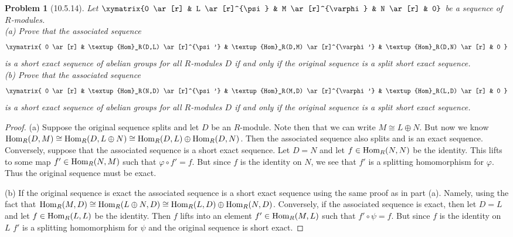 \documentclass{article}
\newcommand{\Hom}{\textup{Hom}}
\newtheorem{problem}{Problem}
\begin{document}
\begin{problem}[10.5.14]
Let $\xymatrix{0 \ar[r] & L \ar[r]^{\psi} & M \ar[r]^{\varphi} & N \ar[r] & 0}$ be a sequence of $R$-modules.\\
(a) Prove that the associated sequence
\[
\xymatrix{
0 \ar[r] & \Hom_R(D,L) \ar[r]^{\psi'} & \Hom_R(D,M) \ar[r]^{\varphi'} & \Hom_R(D,N) \ar[r] & 0
}
\]
is a short exact sequence of abelian groups for all $R$-modules $D$ if and only if the original sequence is a split short exact sequence.\\
(b) Prove that the associated sequence
\[
\xymatrix{
0 \ar[r] & \Hom_R(N,D) \ar[r]^{\psi'} & \Hom_R(M,D) \ar[r]^{\varphi'} & \Hom_R(L,D) \ar[r] & 0
}
\]
is a short exact sequence of abelian groups for all $R$-modules $D$ if and only if the original sequence is a split short exact sequence.
\end{problem}
\begin{proof}
(a) Suppose the original sequence splits and let $D$ be an $R$-module. Note then that we can write $M \cong L \oplus N$. But now we know $\Hom_R(D, M) \cong \Hom_R(D, L \oplus N) \cong \Hom_R(D, L) \oplus \Hom_R(D, N)$. Then the associated sequence also splits and is an exact sequence. Conversely, suppose that the associated sequence is a short exact sequence. Let $D = N$ and let $f \in \Hom_R(N,N)$ be the identity. This lifts to some map $f' \in \Hom_R(N,M)$ such that $\varphi \circ f' = f$. But since $f$ is the identity on $N$, we see that $f'$ is a splitting homomorphism for $\varphi$. Thus the original sequence must be exact.

(b) If the original sequence is exact the associated sequence is a short exact sequence using the same proof as in part (a). Namely, using the fact that $\Hom_R(M,D) \cong \Hom_R(L \oplus N, D) \cong \Hom_R(L, D) \oplus \Hom_R(N, D)$. Conversely, if the associated sequence is exact, then let $D = L$ and let $f \in \Hom_R(L, L)$ be the identity. Then $f$ lifts into an element $f' \in \Hom_R(M, L)$ such that $f' \circ \psi = f$. But since $f$ is the identity on $L$ $f'$ is a splitting homomorphism for $\psi$ and the original sequence is short exact.
\end{proof}
\end{document}
